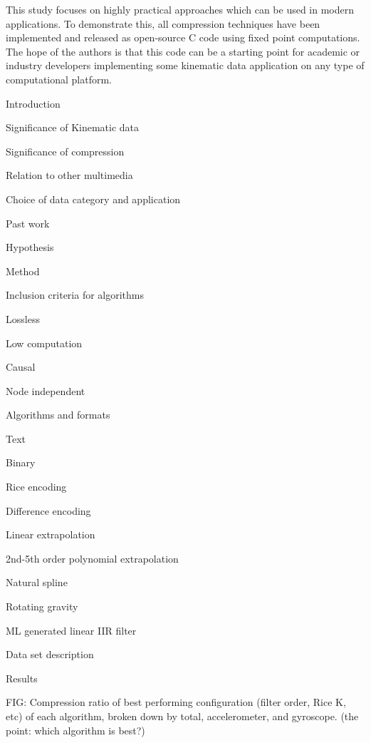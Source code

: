 \documentclass{article}
\begin{document}
\begin{outline}
This study focuses on highly practical approaches which can be used in modern applications. To demonstrate this, all compression techniques have been implemented and released as open-source C code using fixed point computations. The hope of the authors is that this code can be a starting point for academic or industry developers implementing some kinematic data application on any type of computational platform.
\item {Introduction}
\begin{outline}
	\item {Significance of Kinematic data}
	\item {Significance of compression}
	\item {Relation to other multimedia}
	\item {Choice of data category and application}
	\item {Past work}
	\item {Hypothesis}
\end{outline}
\item {Method}
\begin{outline}
	\item{Inclusion criteria for algorithms}
	\begin{outline}
		\item{Lossless}
		\item{Low computation}
		\item{Causal}
		\item{Node independent}
	\end{outline}
	\item{Algorithms and formats}
	\begin{outline}
		\item{Text}
		\item{Binary}
		\item{Rice encoding}
		\item{Difference encoding}
		\item{Linear extrapolation}
		\item{2nd-5th order polynomial extrapolation}
		\item{Natural spline}
		\item{Rotating gravity}
		\item{ML generated linear IIR filter}
	\end{outline}
	\item{Data set description}
\end{outline}
\item {Results}

FIG: Compression ratio of best performing configuration (filter order, Rice K, etc) of each algorithm, broken down by total, accelerometer, and gyroscope. (the point: which algorithm is best?)


\end{outline}
\end{document}
